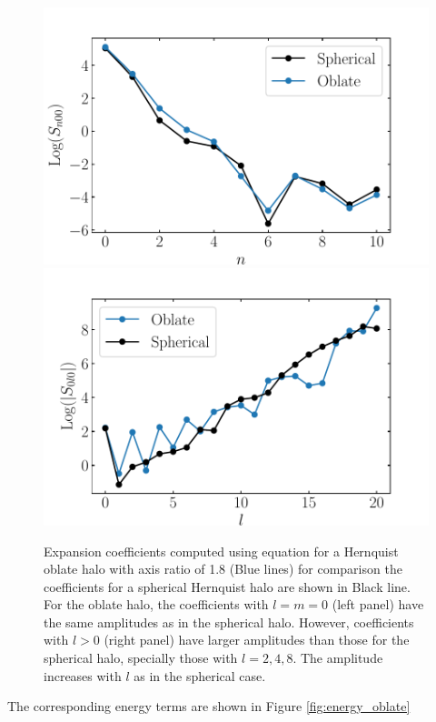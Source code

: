 \documentclass[14pt]{article}
\begin{document}
\begin{figure}[H]
  \centering
  \includegraphics[scale=0.5]{../code/S_n_henrquist_oblate.pdf}
  \includegraphics[scale=0.5]{../code/S_l_henrquist_oblate.pdf}
  \caption{Expansion coefficients computed using equation \label{eq:coeff} for 
  a Hernquist oblate halo with axis ratio of 1.8 (Blue lines) for comparison the 
    coefficients for a spherical Hernquist halo are shown in Black line. For the
oblate halo, the coefficients with $l=m=0$ (left panel) have the same amplitudes as in the
spherical halo. However, coefficients with $l>0$ (right panel) have larger amplitudes 
than those for the spherical halo, specially those with $l=2,4,8$. The amplitude increases with $l$ as in the spherical case.} \label{fig:oblate_coeff}
\end{figure}

The corresponding energy terms are shown in Figure \ref{fig:energy_oblate}
\end{document}
